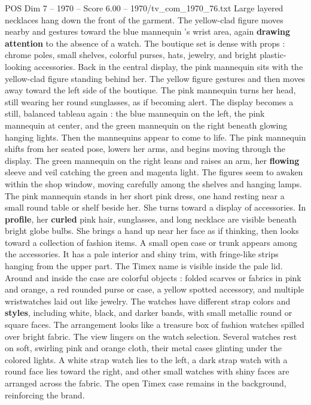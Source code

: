 \begin{textsample}{POS Dim 7 – 1970 – Score 6.00 – 1970/tv\_com\_1970\_76.txt}
Large layered necklaces hang down the front of the garment.
The yellow-clad figure moves nearby and gestures toward the blue mannequin ’s wrist area, again \textbf{drawing} \textbf{attention} to the absence of a watch.
The boutique set is dense with props : chrome poles, small shelves, colorful purses, hats, jewelry, and bright plastic-looking accessories.
Back in the central display, the pink mannequin sits with the yellow-clad figure standing behind her.
The yellow figure gestures and then moves away toward the left side of the boutique.
The pink mannequin turns her head, still wearing her round sunglasses, as if becoming alert.
The display becomes a still, balanced tableau again : the blue mannequin on the left, the pink mannequin at center, and the green mannequin on the right beneath glowing hanging lights.
Then the mannequins appear to come to life.
The pink mannequin shifts from her seated pose, lowers her arms, and begins moving through the display.
The green mannequin on the right leans and raises an arm, her \textbf{flowing} sleeve and veil catching the green and magenta light.
The figures seem to awaken within the shop window, moving carefully among the shelves and hanging lamps.
The pink mannequin stands in her short pink dress, one hand resting near a small round table or shelf beside her.
She turns toward a display of accessories.
In \textbf{profile}, her \textbf{curled} pink hair, sunglasses, and long necklace are visible beneath bright globe bulbs.
She brings a hand up near her face as if thinking, then looks toward a collection of fashion items.
A small open case or trunk appears among the accessories.
It has a pale interior and shiny trim, with fringe-like strips hanging from the upper part.
The Timex name is visible inside the pale lid.
Around and inside the case are colorful objects : folded scarves or fabrics in pink and orange, a red rounded purse or case, a yellow spotted accessory, and multiple wristwatches laid out like jewelry.
The watches have different strap colors and \textbf{styles}, including white, black, and darker bands, with small metallic round or square faces.
The arrangement looks like a treasure box of fashion watches spilled over bright fabric.
The view lingers on the watch selection.
Several watches rest on soft, swirling pink and orange cloth, their metal cases glinting under the colored lights.
A white strap watch lies to the left, a dark strap watch with a round face lies toward the right, and other small watches with shiny faces are arranged across the fabric.
The open Timex case remains in the background, reinforcing the brand.

\end{textsample}
